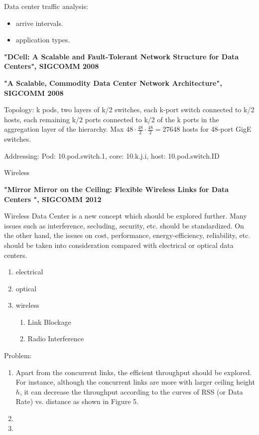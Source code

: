 \documentclass[journal,onecolumn,11pt]{IEEEtran}
\begin{document}
Data center traffic analysis:
\begin{itemize}
  \item arrive intervals.
  \item application types.
\end{itemize}

\textbf{"DCell: A Scalable and Fault-Tolerant Network Structure for Data Centers", SIGCOMM 2008}

\textbf{"A Scalable, Commodity Data Center Network Architecture", SIGCOMM 2008}

Topology: k pods, two layers of k/2 switches, each k-port switch connected to k/2 hosts, each remaining k/2 ports connected to k/2 of the k ports in the aggregation layer of the hierarchy. Max $48\cdot \frac{48}{2} \cdot \frac{48}{2}=27648$ hosts for 48-port GigE switches.

Addressing: Pod: 10.pod.switch.1, core: 10.k.j.i, host: 10.pod.switch.ID

Wireless

\textbf{"Mirror Mirror on the Ceiling: Flexible Wireless Links for Data Centers ", SIGCOMM 2012}

Wireless Data Center is a new concept which should be explored further. Many issues such as interference, secluding, security, etc. should be standardized. On the other hand, the issues on cost, performance, energy-efficiency, reliability, etc. should be taken into consideration compared with electrical or optical data centers.


\begin{enumerate}
  \item electrical
  \item optical
  \item wireless
  \begin{enumerate}
    \item Link Blockage
    \item Radio Interference
  \end{enumerate}
\end{enumerate}

Problem:
\begin{enumerate}
  \item Apart from the concurrent links, the efficient throughput should be explored. For instance, although the concurrent links are more with larger ceiling height $h$, it can decrease the throughput according to the curves of RSS (or Data Rate) vs. distance as shown in Figure 5.
  \item
  \item
\end{enumerate}
\end{document}
